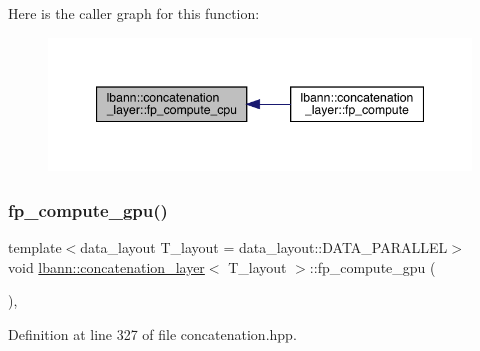 Here is the caller graph for this function\+:\nopagebreak
\begin{figure}[H]
\begin{center}
\leavevmode
\includegraphics[width=347pt]{classlbann_1_1concatenation__layer_a53b3f53828d4982452dd6e79b8ebce50_icgraph}
\end{center}
\end{figure}
\mbox{\label{classlbann_1_1concatenation__layer_afd6cb5cf50acf95c2e3ba2e365be3525}} 
\subsubsection{\texorpdfstring{fp\+\_\+compute\+\_\+gpu()}{fp\_compute\_gpu()}}
{\footnotesize\ttfamily template$<$data\+\_\+layout T\+\_\+layout = data\+\_\+layout\+::\+D\+A\+T\+A\+\_\+\+P\+A\+R\+A\+L\+L\+EL$>$ \\
void \hyperlink{classlbann_1_1concatenation__layer}{lbann\+::concatenation\+\_\+layer}$<$ T\+\_\+layout $>$\+::fp\+\_\+compute\+\_\+gpu (\begin{DoxyParamCaption}{ }\end{DoxyParamCaption})\hspace{0.3cm}{\ttfamily [inline]}, {\ttfamily [protected]}}



Definition at line 327 of file concatenation.\+hpp.


